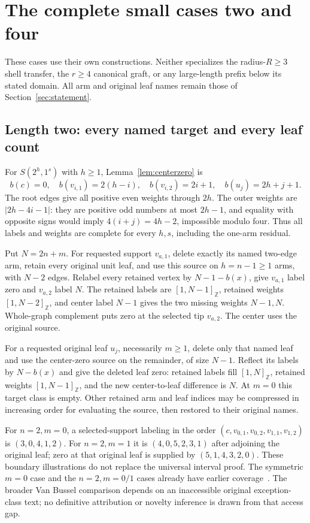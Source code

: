 \documentclass[11pt,a4paper]{article}
\theoremstyle{definition}\newtheorem{definition}[theorem]{Definition}
\theoremstyle{remark}\newtheorem{remark}[theorem]{Remark}
\newcommand{\ints}[2]{[#1,#2]_{\mathbb Z}}
\begin{document}
\section{The complete small cases two and four}\label{sec:twofour}
These cases use their own constructions. Neither specializes the
radius-$R\ge3$ shell transfer, the $r\ge4$ canonical graft, or any
large-length prefix below its stated domain. All arm and original leaf
names remain those of Section~\ref{sec:statement}.

\subsection{Length two: every named target and every leaf count}
For $S(2^h,1^s)$ with $h\ge1$, Lemma~\ref{lem:centerzero} is
\[
 b(c)=0,\quad b(v_{i,1})=2(h-i),\quad b(v_{i,2})=2i+1,
 \quad b(u_j)=2h+j+1.
\]
The root edges give all positive even weights through $2h$.
The outer weights are $|2h-4i-1|$: they are positive odd numbers at
most $2h-1$, and equality with opposite signs would imply
$4(i+j)=4h-2$, impossible modulo four. Thus all labels and weights
are complete for every $h,s$, including the one-arm residual.

Put $N=2n+m$. For requested support $v_{a,1}$, delete exactly its
named two-edge arm, retain every original unit leaf, and use this
source on $h=n-1\ge1$ arms, with $N-2$ edges. Relabel every retained
vertex by $N-1-b(x)$, give $v_{a,1}$ label zero and $v_{a,2}$ label
$N$. The retained labels are $\ints1{N-1}$, retained weights
$\ints1{N-2}$, and center label $N-1$ gives the two missing weights
$N-1,N$. Whole-graph complement puts zero at the selected tip
$v_{a,2}$. The center uses the original source.

For a requested original leaf $u_j$, necessarily $m\ge1$, delete
only that named leaf and use the center-zero source on the remainder,
of size $N-1$. Reflect its labels by $N-b(x)$ and give the deleted
leaf zero: retained labels fill $\ints1N$, retained weights
$\ints1{N-1}$, and the new center-to-leaf difference is $N$.
At $m=0$ this target class is empty. Other retained arm and leaf
indices may be compressed in increasing order for evaluating the
source, then restored to their original names.

For $n=2,m=0$, a selected-support labeling in the order
$(c,v_{0,1},v_{0,2},v_{1,1},v_{1,2})$ is $(3,0,4,1,2)$.
For $n=2,m=1$ it is $(4,0,5,2,3,1)$ after adjoining the original
leaf; zero at that original leaf is supplied by $(5,1,4,3,2,0)$.
These boundary illustrations do not replace the universal interval proof.
The symmetric $m=0$ case and the $n=2,m=0/1$ cases already have
earlier coverage~\cite{rofa,lcr}. The broader Van Bussel comparison
depends on an inaccessible original exception-class text; no definitive
attribution or novelty inference is drawn from that access gap.
\end{document}
